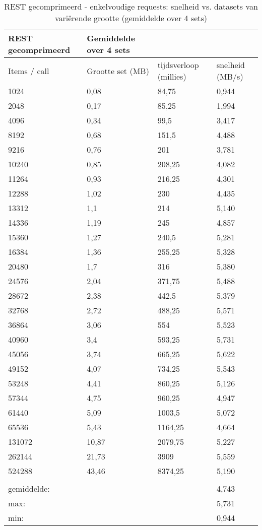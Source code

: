 \begin{table}
    \centering
    \begin{tabular}{llll}
        \toprule
        \textbf{REST gecomprimeerd} & {Gemiddelde over 4 sets} &  & \\
        \midrule
        Items / call & Grootte set (MB) & tijdsverloop (millies) & snelheid (MB/s) \\
        1024 & 0,08 & 84,75 & 0,944 \\
        2048 & 0,17 & 85,25 & 1,994 \\
        4096 & 0,34 & 99,5 & 3,417 \\
        8192 & 0,68 & 151,5 & 4,488 \\
        9216 & 0,76 & 201 & 3,781 \\
        10240 & 0,85 & 208,25 & 4,082 \\
        11264 & 0,93 & 216,25 & 4,301 \\
        12288 & 1,02 & 230 & 4,435 \\
        13312 & 1,1 & 214 & 5,140 \\
        14336 & 1,19 & 245 & 4,857 \\
        15360 & 1,27 & 240,5 & 5,281 \\
        16384 & 1,36 & 255,25 & 5,328 \\
        20480 & 1,7 & 316 & 5,380 \\
        24576 & 2,04 & 371,75 & 5,488 \\
        28672 & 2,38 & 442,5 & 5,379 \\
        32768 & 2,72 & 488,25 & 5,571 \\
        36864 & 3,06 & 554 & 5,523 \\
        40960 & 3,4 & 593,25 & 5,731 \\
        45056 & 3,74 & 665,25 & 5,622 \\
        49152 & 4,07 & 734,25 & 5,543 \\
        53248 & 4,41 & 860,25 & 5,126 \\
        57344 & 4,75 & 960,25 & 4,947 \\
        61440 & 5,09 & 1003,5 & 5,072 \\
        65536 & 5,43 & 1164,25 & 4,664 \\
        131072 & 10,87 & 2079,75 & 5,227 \\
        262144 & 21,73 & 3909 & 5,559 \\
        524288 & 43,46 & 8374,25 & 5,190 \\
         &  &  &  \\
        gemiddelde: &  &  & 4,743 \\
        max: &  &  & 5,731 \\
        min: &  &  & 0,944 \\
        \bottomrule
    \end{tabular}
    \caption{REST gecomprimeerd  - enkelvoudige requests: snelheid vs. datasets van vari\"erende grootte (gemiddelde over 4 sets)}
    \label{tab:RESTcompressieenkelvoudig}
\end{table}


